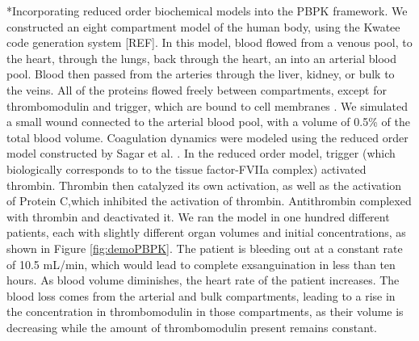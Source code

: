 \documentclass[12pt]{article}
\makeatletter
\renewcommand\paragraph{\@startsection
  {paragraph}{2}{0mm}
  {-0.05in}
  {-0.5\baselineskip}
  {\normalfont\normalsize\itshape}}
\makeatother
\begin{document}
\paragraph*{Incorporating reduced order biochemical models into the PBPK framework.}
We constructed an eight compartment model of the human body, using the Kwatee code generation system [REF].
In this model, blood flowed from a venous pool, to the heart, through the lungs, back through the heart, an into an arterial blood pool.
Blood then passed from the arteries through the liver, kidney, or bulk to the veins. All of the proteins flowed freely between compartments, except for thrombomodulin and trigger, which are bound to cell membranes \cite{esmon1989roles}. We simulated a small wound connected to the arterial blood pool, with a volume of 0.5\% of the total blood volume. Coagulation dynamics were modeled using the reduced order model constructed by Sagar et al. \cite{sagar2015dynamic}. In the reduced order model, trigger (which biologically corresponds to to the tissue factor-FVIIa complex) activated thrombin. Thrombin then catalyzed its own activation, as well as the activation of Protein C,which inhibited the activation of thrombin. Antithrombin complexed with thrombin and deactivated it. We ran the model in one hundred different patients, each with slightly different organ volumes and initial concentrations, as shown in Figure \ref{fig:demoPBPK}. The patient is bleeding out at a constant rate of 10.5 mL/min, which would lead to complete exsanguination in less than ten hours. As blood volume diminishes, the heart rate of the patient increases.
The blood loss comes from the arterial and bulk compartments, leading to a rise in the concentration in thrombomodulin in those compartments, as their volume is decreasing while the amount of thrombomodulin present remains constant.

\end{document}
